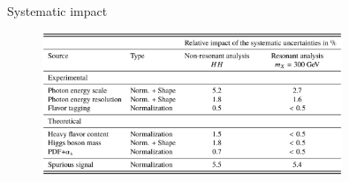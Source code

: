 \begin{frame}{Systematic impact}
\begin{figure}
    \centering
    \includegraphics[width=0.8\textwidth]{BackUp/Part3/Img/Systematics.png}
\end{figure}    
\end{frame}

